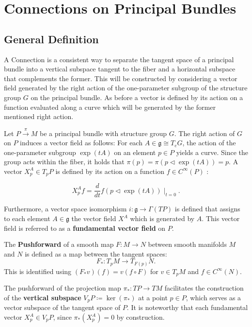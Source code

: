 
\chapter{Connections on Principal Bundles}

\section{General Definition}

A Connection is a consistent way to separate the tangent space of a principal bundle into a vertical subspace tangent to the fiber and a horizontal subspace that complements the former. This will be constructed by considering a vector field generated by the right action of the one-parameter subgroup of the structure group $G$ on the principal bundle. As before a vector is defined by its action on a function evaluated along a curve which will be generated by the former mentioned right action.

Let \( P \xrightarrow{\pi} M \) be a principal bundle with structure group \( G \). The right action of \( G \) on \( P \) induces a vector field as follows: For each \( A \in \mathfrak{g} \cong T_eG \), the action of the one-parameter subgroup \( \exp(tA) \) on an element \( p \in P \) yields a curve. Since the group acts within the fiber, it holds that \( \pi(p) = \pi(p \triangleleft \exp(tA)) = p \). A vector \( X^A_p \in T_pP \) is defined by its action on a function \( f \in C^\infty(P) \) \cite{NakaharaGeometrytopologyphysics2005}:

\[
X^A_p f = \frac{d}{dt} f(p \triangleleft \exp(tA))\mid_{t=0}.
\]

Furthermore, a vector space isomorphism \( i: \mathfrak{g} \longrightarrow \Gamma(TP) \) is defined that assigns to each element \( A \in \mathfrak{g} \) the vector field \( X^A \) which is generated by $A$. This vector field is referred to as a \textbf{fundamental vector field} on \( P \).

The \textbf{Pushforward} \cite{Pushforward2025} of a smooth map \( F:M \longrightarrow N \) between smooth manifolds \( M \) and \( N \) is defined as a map between the tangent spaces:
\[
F_* : T_pM \longrightarrow T_{F(p)}N.
\]
This is identified using \( (F_*v)(f) = v(f\circ F) \) for \( v \in T_pM \) and \( f \in C^\infty(N) \).

The pushforward of the projection map \( \pi_* : TP \longrightarrow TM \) facilitates the construction of the \textbf{vertical subspace} \( V_pP \coloneq \ker(\pi_*) \) at a point \( p \in P \), which serves as a vector subspace of the tangent space of \( P \).
It is noteworthy that each fundamental vector \( X^A_p \in V_pP \), since \( \pi_* (X^A_p) = 0 \) by construction.

